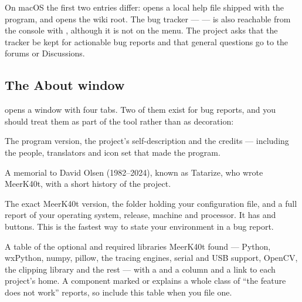 \begin{notebox}
On macOS the first two entries differ:  opens a local help
file shipped with the program, and  opens the wiki root. The
bug tracker --- {\scriptsize{}} --- is also
reachable from the console with , although it is not on the
 menu. The project asks that the tracker be kept for actionable bug
reports and that general questions go to the forums or Discussions.
\end{notebox}

\subsection*{The About window}

 opens a window with four tabs. Two of them exist for
bug reports, and you should treat them as part of the tool rather than as
decoration:

\begin{description}[leftmargin=1.4em,style=nextline]
  \item[\tabname{About}] The program version, the project's self-description and
        the credits --- including the people, translators and icon set that made
        the program.
  \item[\tabname{In Memory of David Olsen}] A memorial to David Olsen
        (1982--2024), known as Tatarize, who wrote MeerK40t, with a short history
        of the project.
  \item[\tabname{System-Information}] The exact MeerK40t version, the folder
        holding your configuration file, and a full report of your operating
        system, release, machine and processor. It has 
        and  buttons. This is the fastest way to state
        your environment in a bug report.
  \item[\tabname{MeerK40t-Components}] A table of the optional and required
        libraries MeerK40t found --- Python, wxPython, numpy, pillow, the tracing
        engines, serial and USB support, OpenCV, the clipping library and the
        rest --- with a  and a  column and a link to each
        project's home. A component marked  or  explains a
        whole class of ``the feature does not work'' reports, so include this
        table when you file one.
\end{description}

